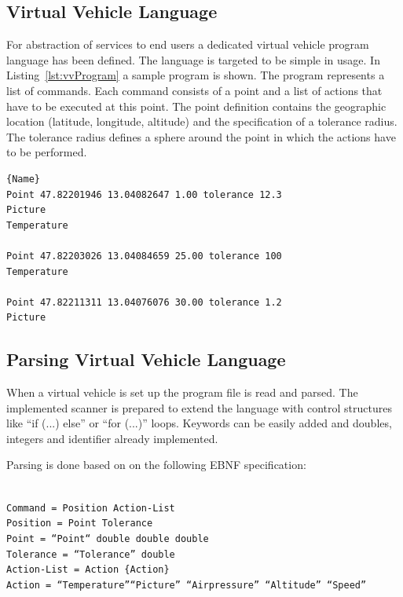 \subsection{Virtual Vehicle Language}

For abstraction of services to end users a dedicated virtual vehicle program language has been defined. The language is targeted to be simple in usage. In Listing~\ref{lst:vvProgram} a sample program is shown. The program represents a list of commands. Each command consists of a point and a list of actions that have to be executed at this point. The point definition contains the geographic location (latitude, longitude, altitude) and the specification of a tolerance radius. The tolerance radius defines a sphere around the point in which the actions have to be performed.

\begin{lstlisting}[caption={Virtual Vehicle Sample Program},mathescape=true,label=lst:vvProgram]{Name}
Point 47.82201946 13.04082647 1.00 tolerance 12.3
Picture
Temperature

Point 47.82203026 13.04084659 25.00 tolerance 100
Temperature

Point 47.82211311 13.04076076 30.00 tolerance 1.2
Picture
\end{lstlisting}

\subsection{Parsing Virtual Vehicle Language}

When a virtual vehicle is set up the program file is read and parsed. The implemented scanner is prepared to extend the 
language with control structures like ``if (...) else'' or ``for (...)'' loops. Keywords can be easily added and doubles, integers 
and identifier already implemented. 

Parsing is done based on on the following EBNF specification: 

\texttt{ \\
Command = Position Action-List \\
Position = Point Tolerance\\
Point = ``Point`` double double double \\
Tolerance = ``Tolerance'' double \\
Action-List = Action \{Action\} \\
Action = ``Temperature''\textbar ``Picture'' \textbar ``Airpressure'' \textbar ``Altitude'' \textbar ``Speed'' \\
}

